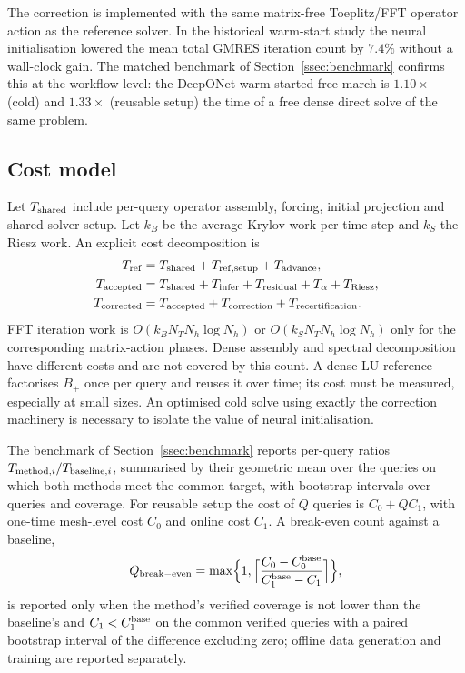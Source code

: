\documentclass[11pt]{amsart}
\theoremstyle{remark}
\begin{document}
The correction is implemented with the same matrix-free Toeplitz/FFT
operator action as the reference solver. In the historical warm-start study
the neural initialisation lowered the mean total GMRES iteration count by
$7.4\%$ without a wall-clock gain. The matched benchmark of
Section~\ref{ssec:benchmark} confirms this at the workflow level: the
DeepONet-warm-started free march is $1.10\times$ (cold) and $1.33\times$
(reusable setup) the time of a free dense direct solve of the same problem.

\subsection{Cost model}
\label{ssec:cost}

Let $T_{\rm shared}$ include per-query operator assembly, forcing,
initial projection and shared solver setup. Let $k_B$ be the average Krylov
work per time step and $k_S$ the Riesz work. An explicit cost decomposition is
\begin{equation}
\begin{aligned}
 T_{\rm ref}&=T_{\rm shared}+T_{\rm ref,setup}+T_{\rm advance},\\
 T_{\rm accepted}&=T_{\rm shared}+T_{\rm infer}+T_{\rm residual}
                   +T_{\alpha}+T_{\rm Riesz},\\
 T_{\rm corrected}&=T_{\rm accepted}+T_{\rm correction}
                         +T_{\rm recertification}.
\end{aligned}
\label{eq:cost-model}
\end{equation}
FFT iteration work is $O(k_BN_TN_h\log N_h)$ or
$O(k_SN_TN_h\log N_h)$ only for the corresponding matrix-action phases.
Dense assembly and spectral decomposition have different costs and are not
covered by this count. A dense LU reference factorises $B_+$ once per query
and reuses it over time; its cost must be measured, especially at small sizes.
An optimised cold solve using exactly the correction machinery is necessary
to isolate the value of neural initialisation.

The benchmark of Section~\ref{ssec:benchmark} reports per-query ratios
$T_{{\rm method},i}/T_{{\rm baseline},i}$, summarised by their geometric
mean over the queries on which both methods meet the common target, with
bootstrap intervals over queries and coverage. For reusable setup the cost
of $Q$ queries is $C_0+QC_1$, with one-time mesh-level cost $C_0$ and online
cost $C_1$. A break-even count against a baseline,
\[
 Q_{\rm break-even}=\max\Bigl\{1,\Bigl\lceil\frac{C_0-C_0^{\rm base}}
 {C_1^{\rm base}-C_1}\Bigr\rceil\Bigr\},
\]
is reported only when the method's verified coverage is not lower than the
baseline's and $C_1<C_1^{\rm base}$ on the common verified queries with a
paired bootstrap interval of the difference excluding zero; offline data generation and training
are reported separately.
\end{document}
